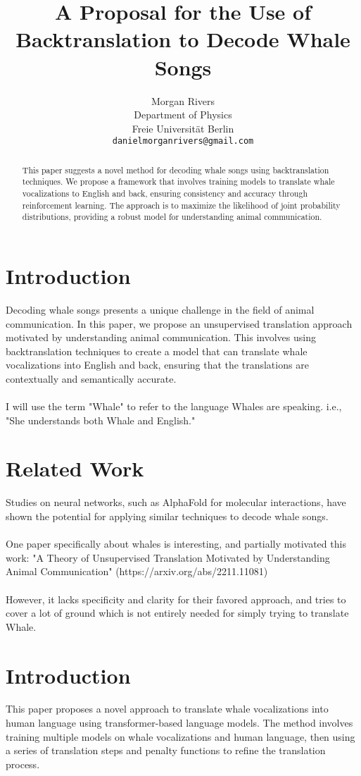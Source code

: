 \documentclass{article}
\title{A Proposal for the Use of Backtranslation to Decode Whale Songs}
\author{Morgan Rivers \\
        Department of Physics \\
        Freie Universität Berlin \\    
        \texttt{danielmorganrivers@gmail.com}
}
\begin{document}
\maketitle

\begin{abstract}
This paper suggests a novel method for decoding whale songs using backtranslation techniques. We propose a framework that involves training models to translate whale vocalizations to English and back, ensuring consistency and accuracy through reinforcement learning. The approach is to maximize the likelihood of joint probability distributions, providing a robust model for understanding animal communication.
\end{abstract}

\section{Introduction}
Decoding whale songs presents a unique challenge in the field of animal communication. In this paper, we propose an unsupervised translation approach motivated by understanding animal communication. This involves using backtranslation techniques to create a model that can translate whale vocalizations into English and back, ensuring that the translations are contextually and semantically accurate.\\ \\
I will use the term "Whale" to refer to the language Whales are speaking. i.e., "She understands both Whale and English."

\section{Related Work}
Studies on neural networks, such as AlphaFold for molecular interactions, have shown the potential for applying similar techniques to decode whale songs. \\ \\
One paper specifically about whales is interesting, and partially motivated this work:
"A Theory of Unsupervised Translation Motivated by Understanding Animal Communication" (https://arxiv.org/abs/2211.11081) \\ \\
However, it lacks specificity and clarity for their favored approach, and tries to cover a lot of ground which is not entirely needed for simply trying to translate Whale.


\section{Introduction}
This paper proposes a novel approach to translate whale vocalizations into human language using transformer-based language models. The method involves training multiple models on whale vocalizations and human language, then using a series of translation steps and penalty functions to refine the translation process.
\end{document}
